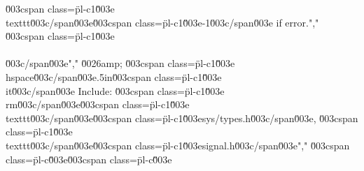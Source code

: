 \u003cspan class=\"pl-c1\"\u003e\\texttt\u003c/span\u003e{\u003cspan class=\"pl-c1\"\u003e-1\u003c/span\u003e} if error.","        \u003cspan class=\"pl-c1\"\u003e\\\\\u003c/span\u003e","    \u0026amp; \u003cspan class=\"pl-c1\"\u003e\\hspace\u003c/span\u003e{.5in}\u003cspan class=\"pl-c1\"\u003e\\it\u003c/span\u003e Include: \u003cspan class=\"pl-c1\"\u003e\\rm\u003c/span\u003e\u003cspan class=\"pl-c1\"\u003e\\texttt\u003c/span\u003e{\u003cspan class=\"pl-c1\"\u003esys/types.h\u003c/span\u003e}, \u003cspan class=\"pl-c1\"\u003e\\texttt\u003c/span\u003e{\u003cspan class=\"pl-c1\"\u003esignal.h\u003c/span\u003e}","        \u003cspan class=\"pl-c\"\u003e\u003cspan class=\"pl-c\"\u003e%